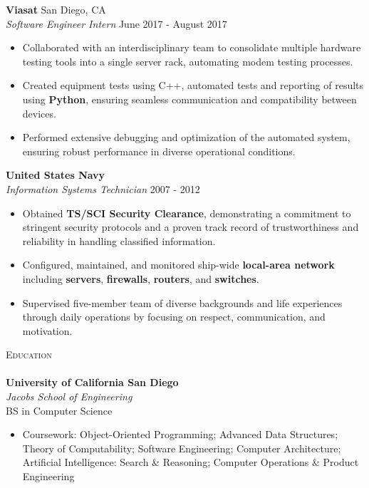 \documentclass[a4paper]{article}
\newcommand{\lineunder} {
    \vspace*{-8pt} \\
    \hspace*{-18pt} \hrulefill \\
}
\newcommand{\header} [1] {
    {\hspace*{-18pt}\vspace*{6pt} \textsc{#1}}
    \vspace*{-6pt} \lineunder
}
\begin{document}
\vspace{-1mm}
\textbf{Viasat} \hfill San Diego, CA\\
\textit{Software Engineer Intern} \hfill June 2017 - August 2017\\
\vspace{-1mm}
\begin{itemize} \itemsep 1pt
    \item Collaborated with an interdisciplinary team to consolidate multiple hardware testing tools into a single server rack, automating modem testing processes.
    \item Created equipment tests using C++, automated tests and reporting of results using \textbf{Python}, ensuring seamless communication and compatibility between devices.
    \item Performed extensive debugging and optimization of the automated system, ensuring robust performance in diverse operational conditions.
\end{itemize}

\textbf{United States Navy} \hfill \\
\textit{Information Systems Technician} \hfill 2007 - 2012\\
\vspace{-1mm}
\begin{itemize} \itemsep 1pt
	\item Obtained \textbf{TS/SCI Security Clearance}, demonstrating a commitment to stringent security protocols and a proven track record of trustworthiness and reliability in handling classified information.
	\item Configured, maintained, and monitored ship-wide \textbf{local-area network} including \textbf{servers}, \textbf{firewalls}, \textbf{routers}, and \textbf{switches}.
	\item Supervised five-member team of diverse backgrounds and life experiences through daily operations by focusing on respect, communication, and motivation.
\end{itemize}

\header{Education}
\textbf{University of California San Diego}\hfill \\
\textit{Jacobs School of Engineering} \\
BS in Computer Science \hfill \\
\begin{itemize} \itemsep 1pt
	\item Coursework: Object-Oriented Programming; Advanced Data Structures; Theory of Computability; Software Engineering; Computer Architecture; Artificial Intelligence: Search \& Reasoning; Computer Operations \& Product Engineering \\
\end{itemize}

\vspace{2mm}
\end{document}

